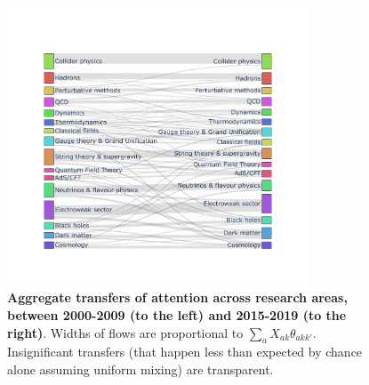 \documentclass{article}
\begin{document}
 \begin{figure}[h]
     \centering
     \includegraphics[width=0.8\textwidth,trim={0 1.5cm 0 1.5cm},clip]{plots/Fig3.pdf}
     \caption{\textbf{Aggregate transfers of attention across research areas, between 2000-2009 (to the left) and 2015-2019 (to the right)}. Widths of flows are proportional to $\sum_a X_{ak}\theta_{akk'}$. Insignificant transfers (that happen less than expected by chance alone assuming uniform mixing) are transparent. }
     \label{fig:sankey}
 \end{figure}
\end{document}
